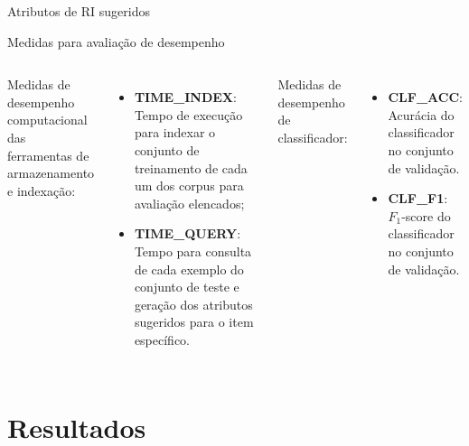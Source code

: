 \documentclass[%
  10pt,%
  aspectratio = 169,%
  compress,%
  t,%
]{beamer}%
\begin{document}
    \begin{frame}{}{Atributos de RI sugeridos}
        
    \end{frame}

    \begin{frame}{}{Medidas para avaliação de desempenho}
        \vspace{0.2cm}
        \begin{columns}[t]
            Medidas de desempenho computacional das ferramentas de armazenamento e indexação:
            \begin{itemize}
                \item \textbf{TIME\_INDEX}: Tempo de execução para indexar o conjunto de treinamento de cada um dos corpus para avaliação elencados;

                \item \textbf{TIME\_QUERY}: Tempo para consulta de cada exemplo do conjunto de teste e geração dos atributos sugeridos para o item específico.
            \end{itemize}

            Medidas de desempenho de classificador:
            \begin{itemize}
                \item \textbf{CLF\_ACC}: Acurácia do classificador no conjunto de validação.
                \item \textbf{CLF\_F1}: $F_1$-score do classificador no conjunto de validação.
            \end{itemize}
        \end{columns}
    \end{frame}

\section{Resultados}\label{sec:result}
\end{document}
